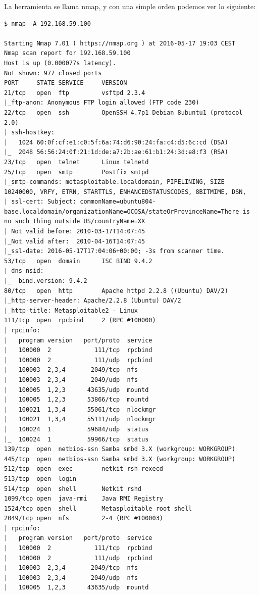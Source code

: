 \documentclass[a4paper,12pt]{scrartcl}
\begin{document}
La herramienta se llama nmap, y con una simple orden podemos ver lo siguiente:

\begin{lstlisting}[breaklines]
$ nmap -A 192.168.59.100

Starting Nmap 7.01 ( https://nmap.org ) at 2016-05-17 19:03 CEST
Nmap scan report for 192.168.59.100
Host is up (0.000077s latency).
Not shown: 977 closed ports
PORT     STATE SERVICE     VERSION
21/tcp   open  ftp         vsftpd 2.3.4
|_ftp-anon: Anonymous FTP login allowed (FTP code 230)
22/tcp   open  ssh         OpenSSH 4.7p1 Debian 8ubuntu1 (protocol 2.0)
| ssh-hostkey: 
|   1024 60:0f:cf:e1:c0:5f:6a:74:d6:90:24:fa:c4:d5:6c:cd (DSA)
|_  2048 56:56:24:0f:21:1d:de:a7:2b:ae:61:b1:24:3d:e8:f3 (RSA)
23/tcp   open  telnet      Linux telnetd
25/tcp   open  smtp        Postfix smtpd
|_smtp-commands: metasploitable.localdomain, PIPELINING, SIZE 10240000, VRFY, ETRN, STARTTLS, ENHANCEDSTATUSCODES, 8BITMIME, DSN, 
| ssl-cert: Subject: commonName=ubuntu804-base.localdomain/organizationName=OCOSA/stateOrProvinceName=There is no such thing outside US/countryName=XX
| Not valid before: 2010-03-17T14:07:45
|_Not valid after:  2010-04-16T14:07:45
|_ssl-date: 2016-05-17T17:04:06+00:00; -3s from scanner time.
53/tcp   open  domain      ISC BIND 9.4.2
| dns-nsid: 
|_  bind.version: 9.4.2
80/tcp   open  http        Apache httpd 2.2.8 ((Ubuntu) DAV/2)
|_http-server-header: Apache/2.2.8 (Ubuntu) DAV/2
|_http-title: Metasploitable2 - Linux
111/tcp  open  rpcbind     2 (RPC #100000)
| rpcinfo: 
|   program version   port/proto  service
|   100000  2            111/tcp  rpcbind
|   100000  2            111/udp  rpcbind
|   100003  2,3,4       2049/tcp  nfs
|   100003  2,3,4       2049/udp  nfs
|   100005  1,2,3      43635/udp  mountd
|   100005  1,2,3      53866/tcp  mountd
|   100021  1,3,4      55061/tcp  nlockmgr
|   100021  1,3,4      55111/udp  nlockmgr
|   100024  1          59684/udp  status
|_  100024  1          59966/tcp  status
139/tcp  open  netbios-ssn Samba smbd 3.X (workgroup: WORKGROUP)
445/tcp  open  netbios-ssn Samba smbd 3.X (workgroup: WORKGROUP)
512/tcp  open  exec        netkit-rsh rexecd
513/tcp  open  login
514/tcp  open  shell       Netkit rshd
1099/tcp open  java-rmi    Java RMI Registry
1524/tcp open  shell       Metasploitable root shell
2049/tcp open  nfs         2-4 (RPC #100003)
| rpcinfo: 
|   program version   port/proto  service
|   100000  2            111/tcp  rpcbind
|   100000  2            111/udp  rpcbind
|   100003  2,3,4       2049/tcp  nfs
|   100003  2,3,4       2049/udp  nfs
|   100005  1,2,3      43635/udp  mountd

\end{lstlisting}
\end{document}

